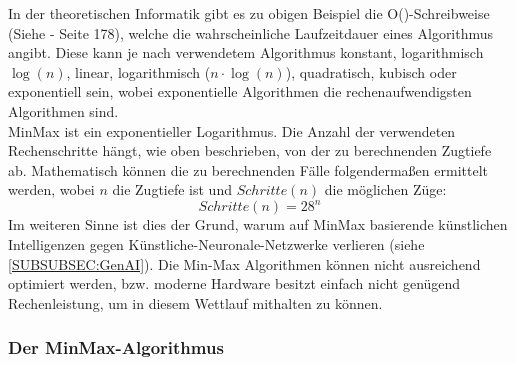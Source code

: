\documentclass[12pt,a4paper]{article}
\begin{document}
{In der theoretischen Informatik gibt es zu obigen Beispiel die O()-Schreibweise (Siehe \cite{pragmatic} - Seite 178), welche die wahrscheinliche Laufzeitdauer eines Algorithmus angibt. Diese kann je nach verwendetem Algorithmus konstant, logarithmisch $\log(n)$, linear, logarithmisch ($n \cdot \log(n)$), quadratisch, kubisch oder exponentiell sein, wobei exponentielle Algorithmen die rechenaufwendigsten Algorithmen sind. \\
MinMax ist ein exponentieller Logarithmus. Die Anzahl der verwendeten Rechenschritte hängt, wie oben beschrieben, von der zu berechnenden Zugtiefe ab. Mathematisch können die zu berechnenden Fälle folgendermaßen ermittelt werden, wobei $n$ die Zugtiefe ist und $Schritte(n)$ die möglichen Züge:
\[Schritte(n) = 28^n\]
Im weiteren Sinne ist dies der Grund, warum auf MinMax basierende künstlichen Intelligenzen gegen Künstliche-Neuronale-Netzwerke verlieren (siehe \ref{SUBSUBSEC:GenAI}). Die Min-Max Algorithmen können nicht ausreichend optimiert werden, bzw. moderne Hardware besitzt einfach nicht genügend Rechenleistung, um in diesem Wettlauf mithalten zu können. \\

\newpage
\subsubsection{Der MinMax-Algorithmus}
\label{SUBSUBSEC:MinMax}

}
\end{document}
